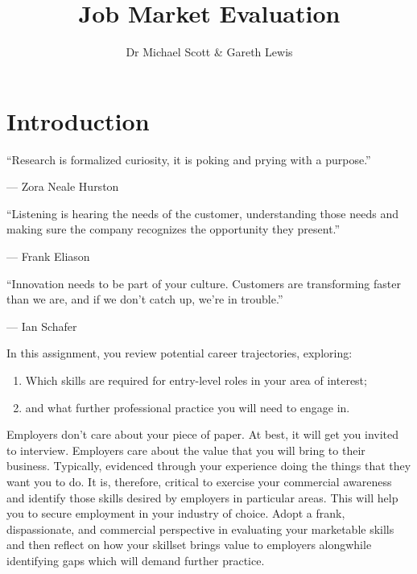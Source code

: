 \documentclass{../../fal_assignment}
\title{Job Market Evaluation}
\author{Dr Michael Scott \& Gareth Lewis}
\begin{document}
\maketitle

\section*{Introduction}

\begin{marginquote}
  ``Research is formalized curiosity, it is poking and prying with a purpose.''
  
   --- Zora Neale Hurston
   
    \marginquoterule
    
    ``Listening is hearing the needs of the customer, understanding those needs and making sure the company recognizes the opportunity they present.''
    
    --- Frank Eliason
    
    \marginquoterule
    
    ``Innovation needs to be part of your culture. Customers are transforming faster than we are, and if we don't catch up, we're in trouble.''
    
    --- Ian Schafer
      
\end{marginquote}

In this assignment, you review potential career trajectories, exploring: 

\begin{enumerate}[label=(\roman*)]
    \item Which skills are required for entry-level roles in your area of interest;
    \item and what further professional practice you will need to engage in.
\end{enumerate}

Employers don't care about your piece of paper. At best, it will get you invited to interview. Employers care about the value that you will bring to their business. Typically, evidenced through your experience doing the things that they want you to do. It is, therefore, critical to exercise your commercial awareness and identify those skills desired by employers in particular areas. This will help you to secure employment in your industry of choice. Adopt a frank, dispassionate, and commercial perspective in evaluating your marketable skills and then reflect on how your skillset brings value to employers alongwhile identifying gaps which will demand further practice.
\end{document}
